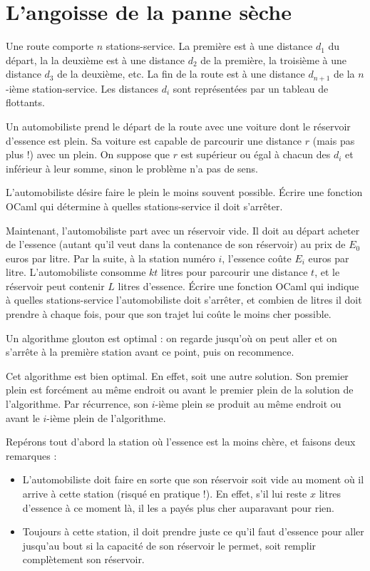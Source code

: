 \renewcommand{\SourceFile}{8-vers-la-recursivite/src/8-1.ml}

\section{L'angoisse de la panne sèche}

Une route comporte $n$ stations-service. La première est à une distance $d_1$ du départ, la la deuxième est à une distance $d_2$ de la première, la troisième à une distance $d_3$ de la deuxième, etc. La fin de la route est à une distance $d_{n+1}$ de la $n$-ième station-service. Les distances $d_i$ sont représentées par un tableau de flottants.
\medskip

Un automobiliste prend le départ de la route avec une voiture dont le réservoir d'essence est plein. Sa voiture est capable de parcourir une distance $r$ (mais pas plus !) avec un plein. On suppose que $r$ est supérieur ou égal à chacun des $d_i$ et inférieur à leur somme, sinon le problème n'a pas de sens.

\Q
L'automobiliste désire faire le plein le moins souvent possible. Écrire une fonction OCaml qui détermine à quelles stations-service il doit s'arrêter.

\Q
Maintenant, l'automobiliste part avec un réservoir vide. Il doit au départ acheter de l'essence (autant qu'il veut dans la contenance de son réservoir) au prix de $E_0$ euros par litre. Par la suite, à la station numéro $i$, l'essence coûte $E_i$ euros par litre. L'automobiliste consomme $kt$ litres pour parcourir une distance $t$, et le réservoir peut contenir $L$ litres d'essence. Écrire une fonction OCaml qui indique à quelles stations-service l'automobiliste doit s'arrêter, et combien de litres il doit prendre à chaque fois, pour que son trajet lui coûte le moins cher possible.

\Corrige

\Q
Un algorithme glouton est optimal : on regarde jusqu'où on peut aller et on s'arrête à la première station avant ce point, puis on recommence.



Cet algorithme est bien optimal. En effet, soit une autre solution. Son premier plein est forcément au même endroit ou avant le premier plein de la solution de l'algorithme. Par récurrence, son $i$-ième plein se produit au même endroit ou avant le $i$-ième plein de l'algorithme.

\Q
Repérons tout d'abord la station où l'essence est la moins chère, et faisons deux remarques :
\begin{itemize}
    \item L'automobiliste doit faire en sorte que son réservoir soit vide au moment où il arrive à cette station (risqué en pratique !). En effet, s'il lui reste $x$ litres d'essence à ce moment là, il les a payés plus cher auparavant pour rien.
    \item Toujours à cette station, il doit prendre juste ce qu'il faut d'essence pour aller jusqu'au bout si la capacité de son réservoir le permet, soit remplir complètement son réservoir.
\end{itemize}


